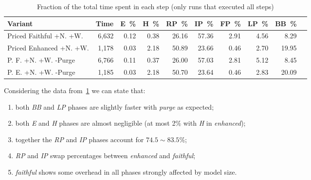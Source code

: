 \documentclass[ppgc,tese,english,formais,babel]{iiufrgs}
\begin{document}
\begin{table}
\centering
{}
\caption{Fraction of the total time spent in each step (only runs that executed all steps)}
\begin{tabular}{lrrrrrrrrr}
\hline\hline
Variant & Time & E~\% & H~\% & RP~\% & IP~\% & FP~\% & LP~\% & BB~\% \\\hline
Priced Faithful +N. +W. & 6,632 & 0.12 & 0.38 & 26.16 & 57.36 & 2.91 & 4.56 & 8.29 \\
Priced Enhanced +N. +W. & 1,178 & 0.03 & 2.18 & 50.89 & 23.66 & 0.46 & 2.70 & 19.95 \\
P. F. +N. +W. -Purge & 6,766 & 0.11 & 0.37 & 26.00 & 57.03 & 2.81 & 5.12 & 8.45 \\
P. E. +N. +W. -Purge & 1,185 & 0.03 & 2.18 & 50.70 & 23.64 & 0.46 & 2.83 & 20.09 \\\hline\hline
\end{tabular}
\label{tab:time_fractions}
\end{table}

Considering the data from~\cref{tab:time_fractions} we can state that:
\begin{enumerate}
\item both \emph{BB} and \emph{LP} phases are slightly faster with \emph{purge} as expected;
\item both \emph{E} and \emph{H} phases are almost negligible (at most 2\% with \emph{H} in \emph{enhanced});
\item together the \emph{RP} and \emph{IP} phases account for \(74.5\sim83.5\)\%;
\item \emph{RP} and \emph{IP} swap percentages between \emph{enhanced} and \emph{faithful};
\item \emph{faithful} shows some overhead in all phases strongly affected by model size.
\end{enumerate}
\end{document}
